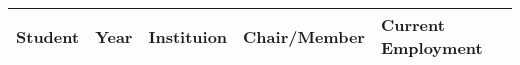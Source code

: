 
\begin{longtable}{lp{1.5cm} p{4.5cm}p{2cm}p{4cm}}
Student & Year & Instituion & Chair/Member & Current Employment\\
\hline 
\endhead 
\end{longtable}


